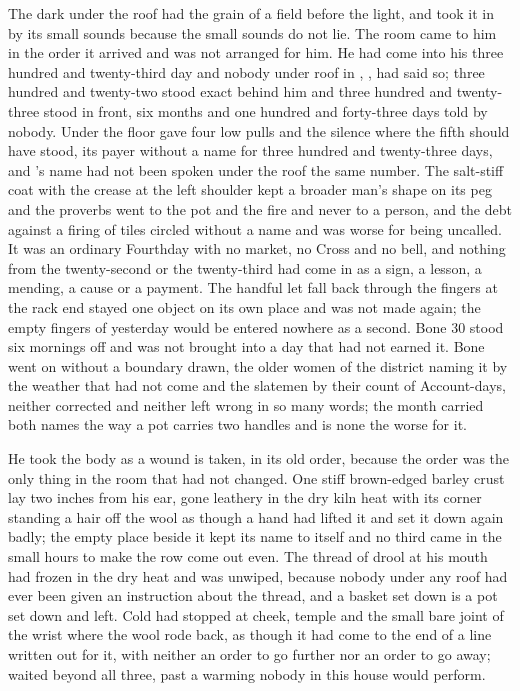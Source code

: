 
The dark under the roof had the grain of a field before the light, and  took it in by its small sounds because the small sounds do not lie. The room came to him in the order it arrived and was not arranged for him. He had come into his three hundred and twenty-third day and nobody under  roof in , ,  had said so; three hundred and twenty-two stood exact behind him and three hundred and twenty-three stood in front, six months and one hundred and forty-three days told by nobody. Under the floor  gave four low pulls and the silence where the fifth should have stood, its payer without a name for three hundred and twenty-three days, and 's name had not been spoken under the roof the same number. The salt-stiff coat with the crease at the left shoulder kept a broader man's shape on its peg and the proverbs went to the pot and the fire and never to a person, and the debt against a firing of tiles circled without a name and was worse for being uncalled. It was an ordinary Fourthday with no market, no Cross and no bell, and nothing from the twenty-second or the twenty-third had come in as a sign, a lesson, a mending, a cause or a payment. The handful let fall back through the fingers at the rack end stayed one object on its own place and was not made again; the empty fingers of yesterday would be entered nowhere as a second. Bone 30 stood six mornings off and was not brought into a day that had not earned it. Bone went on without a boundary drawn, the older women of the district naming it by the weather that had not come and the slatemen by their count of Account-days, neither corrected and neither left wrong in so many words; the month carried both names the way a pot carries two handles and is none the worse for it.

He took the body as a wound is taken, in its old order, because the order was the only thing in the room that had not changed. One stiff brown-edged barley crust lay two inches from his ear, gone leathery in the dry kiln heat with its corner standing a hair off the wool as though a hand had lifted it and set it down again badly; the empty place beside it kept its name to itself and no third came in the small hours to make the row come out even. The thread of drool at his mouth had frozen in the dry heat and was unwiped, because nobody under any roof had ever been given an instruction about the thread, and a basket set down is a pot set down and left. Cold had stopped at cheek, temple and the small bare joint of the wrist where the wool rode back, as though it had come to the end of a line written out for it, with neither an order to go further nor an order to go away;  waited beyond all three, past a warming nobody in this house would perform.

